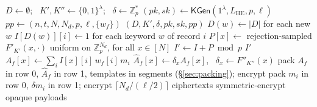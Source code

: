 \documentclass[a4paper,fleqn]{cas-dc}
\begin{document}
\begin{algorithm}[t]
\footnotesize
\caption{Outsourcing at the data owner.}
\label{alg:outsource}
\begin{algorithmic}[1]
  \State $D\gets\emptyset$; \ $K',K''\gets\{0,1\}^\lambda$; \
         $\delta\gets\mathbb{Z}_p^{*}$
  \State $(pk,sk)\gets\mathsf{KGen}(1^\lambda,L_{\mathrm{HE}},p,\ell)$
  \State $pp\gets(n,t,N,N_d,p,\ell,\{w_f\})$
  \State \Return $(D,K',\delta,pk,sk,pp)$
\EndProcedure
\Statex
{}
  \State $D(w)\gets|D|$ for each new $w$
  \State $I[D(w)][i]\gets 1$ for each keyword $w$ of record $i$
  \State $P[x]\gets$ rejection-sampled $F'_{K'}(x,\cdot)$
  \Statex \hfill uniform on $\mathbb{Z}_p^{N_d}$, for all $x\in[N]$
  \State $I'\gets I+P \bmod p$
  \State \Return $I'$ 
\EndProcedure
\Statex
{}
    \State $A_f[x]\gets\sum_i I[x][i]\,w_f[i]\,m_i$
    \State $\widehat{A}_f[x]\gets\delta_x A_f[x]$,
           \ $\delta_x\gets F''_{K''}(x)$
    \State pack $A_f$ in row 0, $\widehat{A}_f$ in row 1,
    \Statex \hfill templates in segments (\S\ref{sec:packing}); encrypt
  \EndFor
\EndProcedure
\Statex
{}
  \State pack $m_i$ in row 0, $\delta m_i$ in row 1; encrypt
  \Statex \hfill $\lceil N_d/(\ell/2)\rceil$ ciphertexts
  \State symmetric-encrypt opaque payloads
\EndProcedure
\end{algorithmic}
\end{algorithm}
\end{document}
